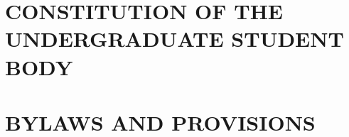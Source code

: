 \documentclass[12pt]{constitution}
\begin{document}
\part{CONSTITUTION OF THE UNDERGRADUATE STUDENT BODY}






\label{PartA}




















\part{BYLAWS AND PROVISIONS}
\label{PartB}
\end{document}
